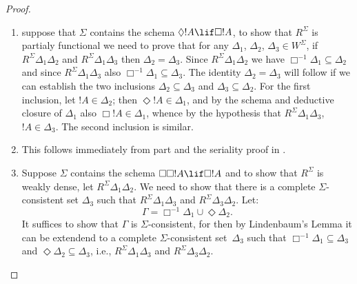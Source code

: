 \documentclass[../../../include/open-logic-section]{subfiles}
\begin{document}
\begin{proof}
  \begin{enumerate}
  \item suppose that $\Sigma$ contains the schema $\Diamond !A \lif
    \Box !A$, to show that $R^\Sigma$ is partialy functional we need
    to prove that for any $\Delta_1$, $\Delta_2$, $\Delta_3 \in
    W^\Sigma$, if $R^\Sigma \Delta_1\Delta_2$ and $R^\Sigma
    \Delta_1\Delta_3$ then $\Delta_2=\Delta_3$. Since $R^\Sigma
    \Delta_1\Delta_2$ we have $\Box^{-1}\Delta_1 \subseteq \Delta_2$
    and since $R^\Sigma \Delta_1\Delta_3$ also $\Box^{-1}\Delta_1
    \subseteq \Delta_3$. The identity
    $\Delta_2=\Delta_3$ will follow if we can establish the two
    inclusions $\Delta_2 \subseteq \Delta_3$ and $\Delta_3 \subseteq
    \Delta_2$. For the first inclusion, let $!A \in \Delta_2$; then
    $\Diamond!A \in \Delta_1$, and by the schema and deductive closure
    of $\Delta_1$ also $\Box!A \in \Delta_1$, whence by the hypothesis
    that $R^\Sigma \Delta_1\Delta_3$, $!A \in \Delta_3$. The second
    inclusion is similar.

  \item This follows immediately from part 
    and the seriality proof in .

  \item Suppose $\Sigma$ contains the schema $\Box\Box!A \lif \Box!A$
    and to show that $R^\Sigma$ is weakly dense, let $R^\Sigma
    \Delta_1\Delta_2$. We need to show that there is a complete
    $\Sigma$-consistent set $\Delta_3$ such that $R^\Sigma
    \Delta_1\Delta_3$ and $R^\Sigma \Delta_3\Delta_2$. Let:
    \[
    \Gamma = \Box^{-1}\Delta_1 \cup \Diamond\Delta_2.
    \]
    It suffices to show that $\Gamma$ is $\Sigma$-consistent, for then
    by Lindenbaum's Lemma it can be extendend to a complete
    $\Sigma$-consistent set~$\Delta_3$ such that $\Box^{-1}\Delta_1
    \subseteq \Delta_3$ and $\Diamond\Delta_2 \subseteq \Delta_3$,
    i.e., $R^\Sigma \Delta_1\Delta_3$ and $R^\Sigma
    \Delta_3\Delta_2$.


\end{enumerate}
\end{proof}
\end{document}
